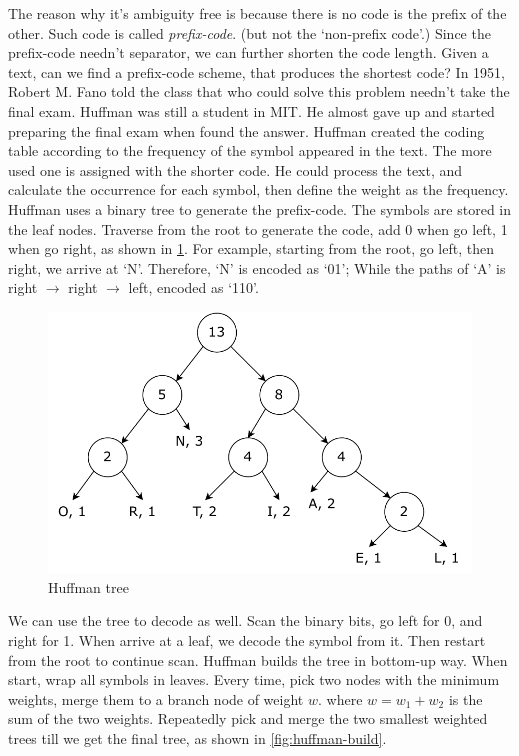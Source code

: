 \documentclass[b5paper]{article}
\begin{document}
The reason why it's ambiguity free is because there is no code is the prefix of the other. Such code is called {\em prefix-code}. (but not the `non-prefix code'.) Since the prefix-code needn't separator, we can further shorten the code length. Given a text, can we find a prefix-code scheme, that produces the shortest code? In 1951, Robert M. Fano told the class that who could solve this problem needn't take the final exam. Huffman was still a student in MIT\cite{Huffman}. He almost gave up and started preparing the final exam when found the answer. Huffman created the coding table according to the frequency of the symbol appeared in the text. The more used one is assigned with the shorter code. He could process the text, and calculate the occurrence for each symbol, then define the weight as the frequency. Huffman uses a binary tree to generate the prefix-code. The symbols are stored in the leaf nodes. Traverse from the root to generate the code, add 0 when go left, 1 when go right, as shown in \cref{fig:huffman-tr}. For example, starting from the root, go left, then right, we arrive at `N'. Therefore, `N' is encoded as `01'; While the paths of `A' is right $\to$ right $\to$ left, encoded as `110'.

\begin{figure}[htbp]
 \centering
 \includegraphics[scale=0.5]{img/huffman-tr}
 \caption{Huffman tree}
 \label{fig:huffman-tr}
\end{figure}

We can use the tree to decode as well. Scan the binary bits, go left for 0, and right for 1. When arrive at a leaf, we decode the symbol from it. Then restart from the root to continue scan. Huffman builds the tree in bottom-up way. When start, wrap all symbols in leaves. Every time, pick two nodes with the minimum weights, merge them to a branch node of weight $w$. where $w = w_1 + w_2$ is the sum of the two weights. Repeatedly pick and merge the two smallest weighted trees till we get the final tree, as shown in \cref{fig:huffman-build}.
\end{document}
